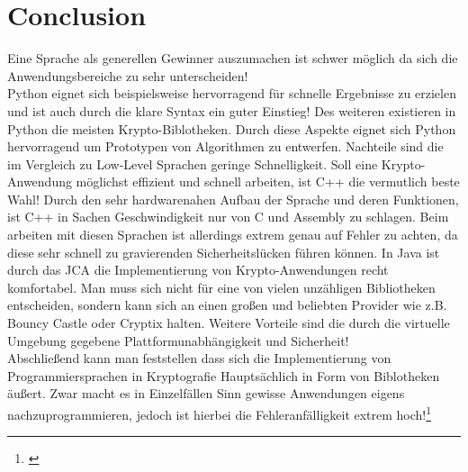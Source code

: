 \documentclass[a4paper,12pt]{scrartcl}
\begin{document}
\section{Conclusion}
Eine Sprache als generellen Gewinner auszumachen ist schwer möglich da sich die Anwendungsbereiche zu sehr unterscheiden!\\
Python eignet sich beispielsweise hervorragend für schnelle Ergebnisse zu erzielen und ist auch durch die klare Syntax ein guter Einstieg! Des weiteren existieren in Python die meisten Krypto-Biblotheken. Durch diese Aspekte eignet sich Python hervorragend um Prototypen von Algorithmen zu entwerfen. Nachteile sind die im Vergleich zu Low-Level Sprachen geringe Schnelligkeit. Soll eine Krypto-Anwendung möglichst effizient und schnell arbeiten, ist C++ die vermutlich beste Wahl! Durch den sehr hardwarenahen Aufbau der Sprache und deren Funktionen, ist C++ in Sachen Geschwindigkeit nur von C und Assembly zu schlagen. Beim arbeiten mit diesen Sprachen ist allerdings extrem
genau auf Fehler zu achten, da diese sehr schnell zu gravierenden Sicherheitslücken führen
können.
In Java ist durch das JCA die Implementierung von Krypto-Anwendungen recht komfortabel. Man muss sich nicht für eine von vielen
unzähligen Bibliotheken entscheiden, sondern kann sich an einen großen und beliebten Provider wie z.B. Bouncy Castle oder Cryptix halten. Weitere Vorteile sind die durch die virtuelle Umgebung gegebene
Plattformunabhängigkeit und Sicherheit!\\
Abschließend kann man feststellen dass sich die Implementierung von Programmiersprachen in Kryptografie Hauptsächlich in Form von Biblotheken äußert. Zwar macht es in Einzelfällen Sinn gewisse Anwendungen eigens nachzuprogrammieren, jedoch ist hierbei die Fehleranfälligkeit extrem hoch!\footnote{\cite{876288}}


\newpage
\end{document}

